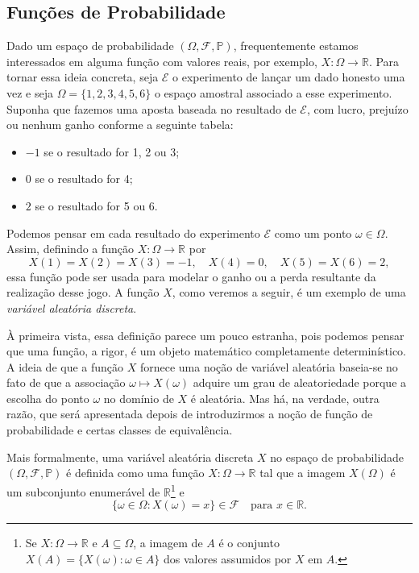 \documentclass[12pt,portuguese]{article}
\theoremstyle{definition}
\begin{document}
\subsection{Funções de Probabilidade}
\label{sec:funcoes-de-massa}

Dado um espaço de probabilidade \((\Omega, \mathcal{F}, \mathbb{P})\),
frequentemente estamos interessados em alguma função com valores reais, por
exemplo, \(X:\Omega\to\mathbb{R}\). Para tornar essa ideia concreta, seja
\(\mathcal{E}\) o experimento de lançar um dado honesto uma vez e seja
\(\Omega = \{1, 2, 3, 4, 5, 6\}\) o espaço amostral associado a esse
experimento. Suponha que fazemos uma aposta baseada no resultado de
\(\mathcal{E}\), com lucro, prejuízo ou nenhum ganho conforme a seguinte
tabela:
\begin{itemize}
  \item \(-1\) se o resultado for 1, 2 ou 3;
  \item \(0\) se o resultado for 4;
  \item \(2\) se o resultado for 5 ou 6.
\end{itemize}
Podemos pensar em cada resultado do experimento \(\mathcal{E}\) como um
ponto \(\omega\in \Omega\). Assim, definindo a função
\(X : \Omega \to \mathbb{R}\) por
\[
  X(1) = X(2) = X(3) = -1, \quad X(4) = 0, \quad X(5) = X(6) = 2,
\]
essa função pode ser usada para modelar o ganho ou a perda resultante da
realização desse jogo. A função \(X\), como veremos a seguir, é um exemplo de
uma \emph{variável aleatória discreta}.

À primeira vista, essa definição parece um pouco estranha, pois podemos
pensar que uma função, a rigor, é um objeto matemático completamente determinístico.
A ideia de que a função \(X\) fornece uma noção de variável aleatória baseia-se
no fato de que a associação \(\omega\longmapsto X(\omega)\) adquire um grau
de aleatoriedade porque a escolha do ponto \(\omega\) no domínio de \(X\) é
aleatória. Mas há, na verdade, outra razão, que será apresentada depois de
introduzirmos a noção de função de probabilidade e certas classes de
equivalência.


\bigskip

Mais formalmente, uma variável aleatória discreta \(X\) no espaço de
probabilidade \((\Omega, \mathcal{F}, \mathbb{P})\) é definida como uma
função \(X : \Omega \to \mathbb{R}\) tal que a imagem \(X(\Omega)\) é um
subconjunto enumerável de \(\mathbb{R}\)\footnote{Se
\(X : \Omega \to \mathbb{R}\) e \(A \subseteq \Omega\), a imagem de \(A\) é
o conjunto \(X(A) = \{X(\omega) : \omega \in A\}\) dos valores assumidos por
\(X\) em \(A\).} e
\begin{equation}\label{eq:va-preimage-evento}
  \{\omega \in \Omega : X(\omega) = x\} \in \mathcal{F} \quad \text{para } x
  \in \mathbb{R}.
\end{equation}
\end{document}
